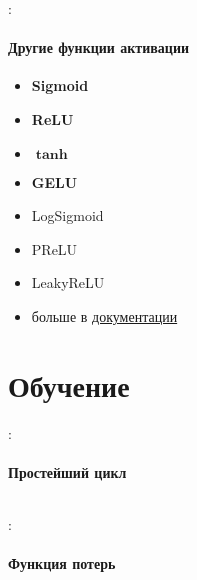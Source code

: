 \documentclass{beamer}
\begin{document}
\begin{frame}{\secname : \subsecname}
  \framesubtitle{Другие функции активации}
  \begin{itemize}
    \item \textbf{Sigmoid}
    \item \textbf{ReLU}
    \item $\boldsymbol{\tanh}$
    \item \textbf{GELU}
    \item LogSigmoid
    \item PReLU
    \item LeakyReLU
    \item больше в
      \href{https://docs.pytorch.org/docs/stable/nn.html\#non-linear-activations-weighted-sum-nonlinearity}{документации}
  \end{itemize}
\end{frame}

\section{Обучение}

\begin{frame}{\secname : \subsecname}
	\framesubtitle{Простейший цикл}
	\inputminted[firstline=42,lastline=50]{python}{linear_regression_1/linear_regression_1.py}
\end{frame}

\begin{frame}{\secname : \subsecname}
	\framesubtitle{Функция потерь}
\end{frame}
\end{document}
